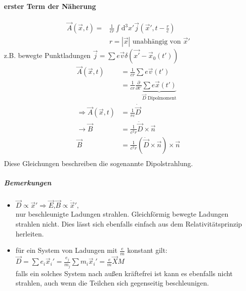\documentclass[a4paper]{article}
\begin{document}
\paragraph{erster Term der Näherung}
\begin{align}
\vec{A}(\vec{x},t)=&\frac{1}{cr}\int\mathrm{d}^3x' \vec{j}(\vec{x}',t-\frac{r}{c})\\
&r=|\vec{x}| \text{ unabhängig von }\vec{x}'
\end{align}
z.B. bewegte Punktladungen $\vec{j}=\sum e\vec{v}
\delta(\vec{x'}-\vec{x}_0(t'))$
\begin{align}
\vec{A}(\vec{x},t)&=\frac{1}{cr}\sum e\vec{v}(t')\\
&=\frac{1}{cr}\frac{\partial}{\partial t'}\underbrace{\sum
e\vec{x}(t')}_{\vec{D} \text{ Dipolmoment}}\\
\Rightarrow \vec{A}(\vec{x},t)&= \frac{1}{rc}\dot{\vec{D}}\\
\rightarrow \vec{B}&=\frac{1}{c^2r}\ddot{\vec{D}}\times\vec{n}\\
\vec{B}&=\frac{1}{c^2r}\left(\ddot{\vec{D}}\times\vec{n}\right)\times\vec{n}\\
\end{align}
Diese Gleichungen beschreiben die sogenannte Dipolstrahlung.
\subparagraph{Bemerkungen}
\begin{itemize}
  \item $\vec{D}\propto\vec{x}' \Rightarrow
  \vec{E}\text{,}\vec{B}\propto\ddot{\vec{x}}',$\\ nur beschleunigte Ladungen
  strahlen. Gleichförmig bewegte Ladungen strahlen nicht. Dies lässt sich
  ebenfalls einfach aus dem Relativitätsprinzip herleiten.
  \item für ein System von Ladungen mit $\frac{e}{m}$ konstant gilt:\\
  $\vec{D}=\sum e_i\vec{x}_i'=\frac{e_j}{m_j}\sum
  m_i\vec{x}_i'=\frac{e}{m}\vec{X}M$\\ falls ein solches System nach
  außen kräftefrei ist kann es ebenfalls nicht strahlen, auch wenn die Teilchen
  sich gegenseitig beschleunigen.
\end{itemize}
\end{document}
